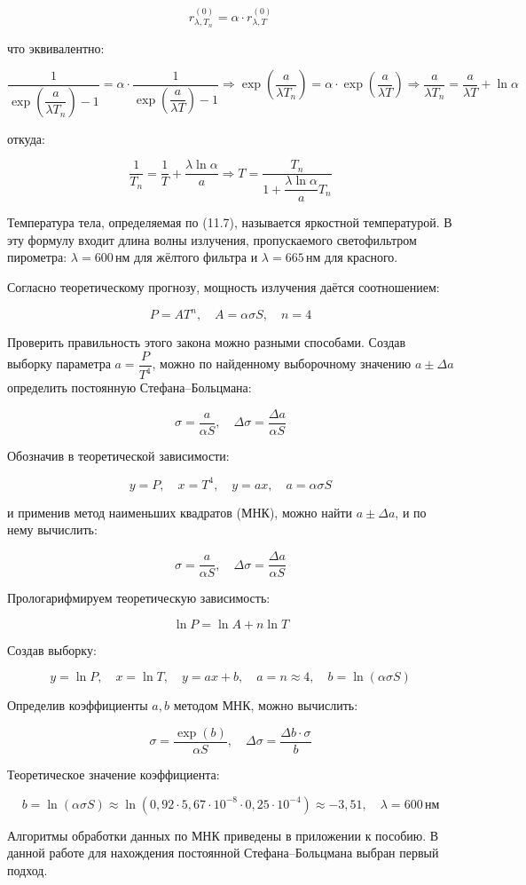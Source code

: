 \[
r^{(0)}_{\lambda, T_n} = \alpha \cdot r^{(0)}_{\lambda, T}
\]

что эквивалентно:

\[
\frac{1}{\exp\left(\dfrac{a}{\lambda T_n}\right) - 1} = \alpha \cdot \frac{1}{\exp\left(\dfrac{a}{\lambda T}\right) - 1}
\Rightarrow \exp\left(\frac{a}{\lambda T_n}\right) = \alpha \cdot \exp\left(\frac{a}{\lambda T}\right)
\Rightarrow \frac{a}{\lambda T_n} = \frac{a}{\lambda T} + \ln \alpha
\]

откуда:

\[
\frac{1}{T_n} = \frac{1}{T} + \frac{\lambda \ln \alpha}{a} \Rightarrow T = \frac{T_n}{1 + \dfrac{\lambda \ln \alpha}{a} T_n} \tag{11.7}
\]

Температура тела, определяемая по (11.7), называется яркостной температурой. В эту формулу входит длина волны излучения, пропускаемого светофильтром пирометра: \( \lambda = 600\,\text{нм} \) для жёлтого фильтра и \( \lambda = 665\,\text{нм} \) для красного.

Согласно теоретическому прогнозу, мощность излучения даётся соотношением:

\[
P = A T^n, \quad A = \alpha \sigma S, \quad n = 4
\]

Проверить правильность этого закона можно разными способами. Создав выборку параметра \( a = \dfrac{P}{T^4} \), можно по найденному выборочному значению \( a \pm \Delta a \) определить постоянную Стефана–Больцмана:

\[
\sigma = \frac{a}{\alpha S}, \quad \Delta \sigma = \frac{\Delta a}{\alpha S}
\]

Обозначив в теоретической зависимости:

\[
y = P, \quad x = T^4, \quad y = ax, \quad a = \alpha \sigma S
\]

и применив метод наименьших квадратов (МНК), можно найти \( a \pm \Delta a \), и по нему вычислить:

\[
\sigma = \frac{a}{\alpha S}, \quad \Delta \sigma = \frac{\Delta a}{\alpha S}
\]

Прологарифмируем теоретическую зависимость:

\[
\ln P = \ln A + n \ln T
\]

Создав выборку:

\[
y = \ln P, \quad x = \ln T, \quad y = ax + b, \quad a = n \approx 4, \quad b = \ln(\alpha \sigma S)
\]

Определив коэффициенты \( a, b \) методом МНК, можно вычислить:

\[
\sigma = \frac{\exp(b)}{\alpha S}, \quad \Delta \sigma = \frac{\Delta b \cdot \sigma}{b}
\]

Теоретическое значение коэффициента:

\[
b = \ln(\alpha \sigma S) \approx \ln(0{,}92 \cdot 5{,}67 \cdot 10^{-8} \cdot 0{,}25 \cdot 10^{-4}) \approx -3{,}51, \quad \lambda = 600\,\text{нм}
\]

Алгоритмы обработки данных по МНК приведены в приложении к пособию. В данной работе для нахождения постоянной Стефана–Больцмана выбран первый подход.
